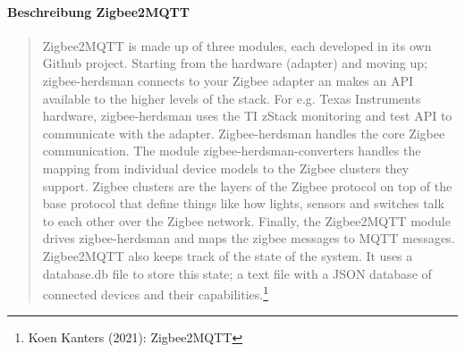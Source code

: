 \newpage
\noindent \paragraph{Beschreibung Zigbee2MQTT}
\begin{quote}
    \color{quotetext}
 		Zigbee2MQTT is made up of three modules, each developed in its own Github project. Starting from the hardware (adapter) and moving up; zigbee-herdsman connects to your Zigbee adapter an makes an API available to the higher levels of the stack. For e.g. Texas Instruments hardware, zigbee-herdsman uses the TI zStack monitoring and test API to communicate with the adapter. Zigbee-herdsman handles the core Zigbee communication. The module zigbee-herdsman-converters handles the mapping from individual device models to the Zigbee clusters they support. Zigbee clusters are the layers of the Zigbee protocol on top of the base protocol that define things like how lights, sensors and switches talk to each other over the Zigbee network. Finally, the Zigbee2MQTT module drives zigbee-herdsman and maps the zigbee messages to MQTT messages. Zigbee2MQTT also keeps track of the state of the system. It uses a database.db file to store this state; a text file with a JSON database of connected devices and their capabilities.\footnote{Koen Kanters (2021): Zigbee2MQTT}
\end{quote} 